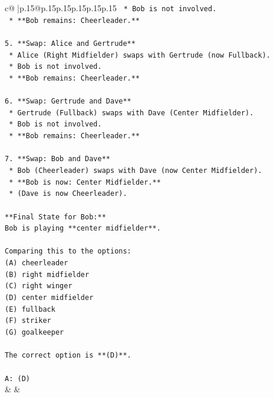 \documentclass{article}
\begin{document}
{\begin{supertabular}{c@{$\;$}|p{.15\linewidth}@{}p{.15\linewidth}p{.15\linewidth}p{.15\linewidth}p{.15\linewidth}p{.15\linewidth}}
{{{\texttt{    *   Bob is not involved.} \\
\texttt{    *   **Bob remains: Cheerleader.**} \\
\\ 
\texttt{5.  **Swap: Alice and Gertrude**} \\
\texttt{    *   Alice (Right Midfielder) swaps with Gertrude (now Fullback).} \\
\texttt{    *   Bob is not involved.} \\
\texttt{    *   **Bob remains: Cheerleader.**} \\
\\ 
\texttt{6.  **Swap: Gertrude and Dave**} \\
\texttt{    *   Gertrude (Fullback) swaps with Dave (Center Midfielder).} \\
\texttt{    *   Bob is not involved.} \\
\texttt{    *   **Bob remains: Cheerleader.**} \\
\\ 
\texttt{7.  **Swap: Bob and Dave**} \\
\texttt{    *   Bob (Cheerleader) swaps with Dave (now Center Midfielder).} \\
\texttt{    *   **Bob is now: Center Midfielder.**} \\
\texttt{    *   (Dave is now Cheerleader).} \\
\\ 
\texttt{**Final State for Bob:**} \\
\texttt{Bob is playing **center midfielder**.} \\
\\ 
\texttt{Comparing this to the options:} \\
\texttt{(A) cheerleader} \\
\texttt{(B) right midfielder} \\
\texttt{(C) right winger} \\
\texttt{(D) center midfielder} \\
\texttt{(E) fullback} \\
\texttt{(F) striker} \\
\texttt{(G) goalkeeper} \\
\\ 
\texttt{The correct option is **(D)**.} \\
\\ 
\texttt{A: (D)} \\
            }
        }
    }
    & & \\ \\


\end{supertabular}}
\end{document}
